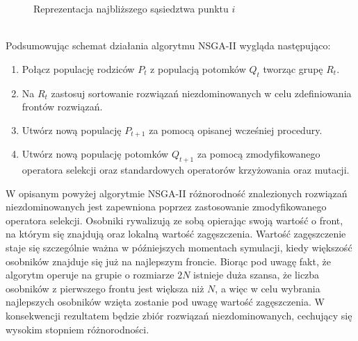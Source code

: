 \documentclass[twoside]{iisthesis}
\begin{document}
\begin{figure}[!htb]
	\centering
	\caption{Reprezentacja najbliższego sąsiedztwa punktu $i$}
	\label{fig:nsga2_cd}
\end{figure}
\\Podsumowując schemat działania algorytmu NSGA-II wygląda następująco:\\
\begin{enumerate}
	\item Połącz populację rodziców $P_{t}$ z populacją potomków $Q_{t}$ tworząc grupę $R_{t}$.
	\item Na $R_{t}$ zastosuj sortowanie rozwiązań niezdominowanych w celu zdefiniowania frontów rozwiązań.
	\item Utwórz nową populację $P_{t+1}$ za pomocą opisanej wcześniej procedury.
	\item Utwórz nową populację potomków $Q_{t+1}$ za pomocą zmodyfikowanego operatora selekcji oraz standardowych operatorów krzyżowania oraz mutacji.\\
\end{enumerate}

W opisanym powyżej algorytmie NSGA-II różnorodność znalezionych rozwiązań niezdominowanych jest zapewniona poprzez zastosowanie zmodyfikowanego operatora selekcji. Osobniki rywalizują ze sobą opierając swoją wartość o front, na którym się znajdują oraz lokalną wartość zagęszczenia. Wartość zagęszczenie staje się szczególnie ważna w późniejszych momentach symulacji, kiedy większość osobników znajduje się już na najlepszym froncie. Biorąc pod uwagę fakt, że algorytm operuje na grupie o rozmiarze $2N$ istnieje duża szansa, że liczba osobników z pierwszego frontu jest większa niż $N$, a więc w celu wybrania najlepszych osobników wzięta zostanie pod uwagę wartość zagęszczenia. W konsekwencji rezultatem będzie zbiór rozwiązań niezdominowanych, cechujący się wysokim stopniem różnorodności.
\end{document}

